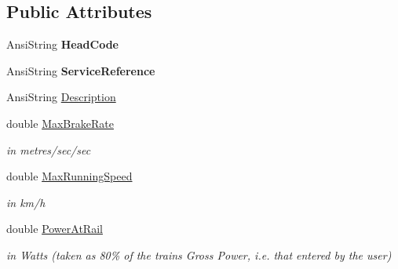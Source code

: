 \subsection*{Public Attributes}
\begin{DoxyCompactItemize}
\item 
\mbox{\label{class_t_train_data_entry_aa1c7c0c8f2437744f49d7e2856180dd8}} 
Ansi\+String {\bfseries Head\+Code}
\item 
\mbox{\label{class_t_train_data_entry_aadf0846698c4d7d596c9280037834456}} 
Ansi\+String {\bfseries Service\+Reference}
\item 
Ansi\+String \mbox{\hyperlink{class_t_train_data_entry_aea5870826c3c6815472e86d82b0c9fe7}{Description}}
\item 
\mbox{\label{class_t_train_data_entry_a3d7e696d79ee15cae196c0197fed3821}} 
double \mbox{\hyperlink{class_t_train_data_entry_a3d7e696d79ee15cae196c0197fed3821}{Max\+Brake\+Rate}}
\begin{DoxyCompactList}\small\item\em in metres/sec/sec \end{DoxyCompactList}\item 
\mbox{\label{class_t_train_data_entry_aaef868581a7c5383f70f119b1f551178}} 
double \mbox{\hyperlink{class_t_train_data_entry_aaef868581a7c5383f70f119b1f551178}{Max\+Running\+Speed}}
\begin{DoxyCompactList}\small\item\em in km/h \end{DoxyCompactList}\item 
\mbox{\label{class_t_train_data_entry_a41d5f92deb8a429cad0e1dadf2727fe4}} 
double \mbox{\hyperlink{class_t_train_data_entry_a41d5f92deb8a429cad0e1dadf2727fe4}{Power\+At\+Rail}}
\begin{DoxyCompactList}\small\item\em in Watts (taken as 80\% of the train\textquotesingle{}s Gross Power, i.\+e. that entered by the user) \end{DoxyCompactList}\item 
\mbox{\label{class_t_train_data_entry_a16d6c71abfab0a1ebd961fe3cd3edae7}} 

\end{DoxyCompactItemize}
